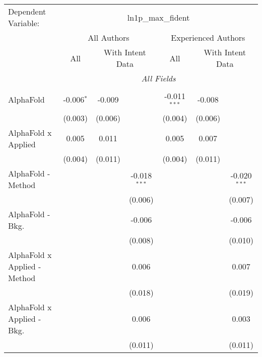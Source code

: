\begingroup
\centering
\begin{tabular}{lcccccc}
   \tabularnewline \midrule \midrule
   Dependent Variable: & \multicolumn{6}{c}{ln1p\_max\_fident}\\
 & \multicolumn{3}{c}{All Authors} & \multicolumn{3}{c}{Experienced Authors} \\
\cmidrule(lr){2-4} \cmidrule(lr){5-7}
 & \multicolumn{1}{c}{All} & \multicolumn{2}{c}{With Intent Data} & \multicolumn{1}{c}{All} & \multicolumn{2}{c}{With Intent Data} \\
\cmidrule(lr){2-2} \cmidrule(lr){3-4} \cmidrule(lr){5-5} \cmidrule(lr){6-7}
 & \multicolumn{6}{c}{\textit{All Fields}} \\ \\
   AlphaFold                      & -0.006$^{*}$ & -0.009      &                & -0.011$^{***}$ & -0.008      &   \\   
                                  & (0.003)      & (0.006)     &                & (0.004)        & (0.006)     &   \\   
   AlphaFold x Applied            & 0.005        & 0.011       &                & 0.005          & 0.007       &   \\   
                                  & (0.004)      & (0.011)     &                & (0.004)        & (0.011)     &   \\   
   AlphaFold - Method             &              &             & -0.018$^{***}$ &                &             & -0.020$^{***}$\\   
                                  &              &             & (0.006)        &                &             & (0.007)\\   
   AlphaFold - Bkg.               &              &             & -0.006         &                &             & -0.006\\   
                                  &              &             & (0.008)        &                &             & (0.010)\\   
   AlphaFold x Applied - Method   &              &             & 0.006          &                &             & 0.007\\   
                                  &              &             & (0.018)        &                &             & (0.019)\\   
   AlphaFold x Applied - Bkg.     &              &             & 0.006          &                &             & 0.003\\   
                                  &              &             & (0.011)        &                &             & (0.011)\\   

\end{tabular}
